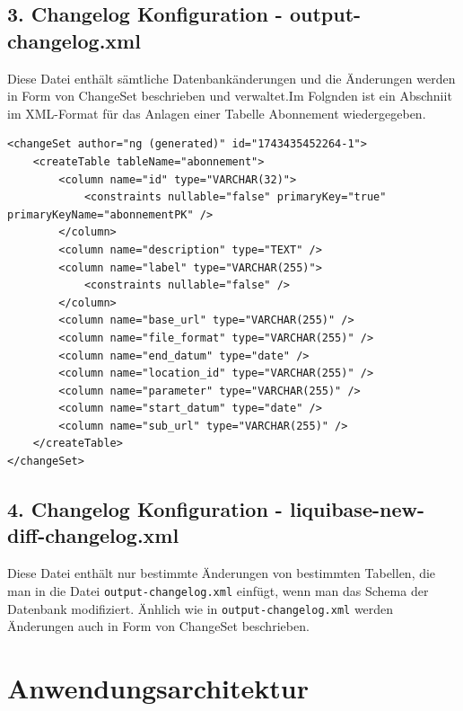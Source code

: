 \documentclass[a4paper,12pt]{scrreprt}
\begin{document}
\section*{\small \textbf{3. Changelog Konfiguration - output-changelog.xml}}
Diese Datei enthält sämtliche Datenbankänderungen und die Änderungen werden in Form von ChangeSet beschrieben und verwaltet.Im Folgnden ist ein Abschniit im XML-Format für das Anlagen einer Tabelle Abonnement wiedergegeben. \\ 
\begin{lstlisting}
<changeSet author="ng (generated)" id="1743435452264-1">
    <createTable tableName="abonnement">
        <column name="id" type="VARCHAR(32)">
            <constraints nullable="false" primaryKey="true" primaryKeyName="abonnementPK" />
        </column>
        <column name="description" type="TEXT" />
        <column name="label" type="VARCHAR(255)">
            <constraints nullable="false" />
        </column>
        <column name="base_url" type="VARCHAR(255)" />
        <column name="file_format" type="VARCHAR(255)" />
        <column name="end_datum" type="date" />
        <column name="location_id" type="VARCHAR(255)" />
        <column name="parameter" type="VARCHAR(255)" />
        <column name="start_datum" type="date" />
        <column name="sub_url" type="VARCHAR(255)" />
    </createTable>
</changeSet>
\end{lstlisting}
\section*{\small \textbf{4. Changelog Konfiguration - liquibase-new-diff-changelog.xml}}
Diese Datei enthält nur bestimmte Änderungen von bestimmten Tabellen, die man in die Datei \texttt{output-changelog.xml} einfügt, wenn man das Schema der Datenbank modifiziert. Änhlich wie in \texttt{output-changelog.xml} werden Änderungen auch in Form von ChangeSet beschrieben.


\chapter{Anwendungsarchitektur}




\printbibliography
\end{document}
